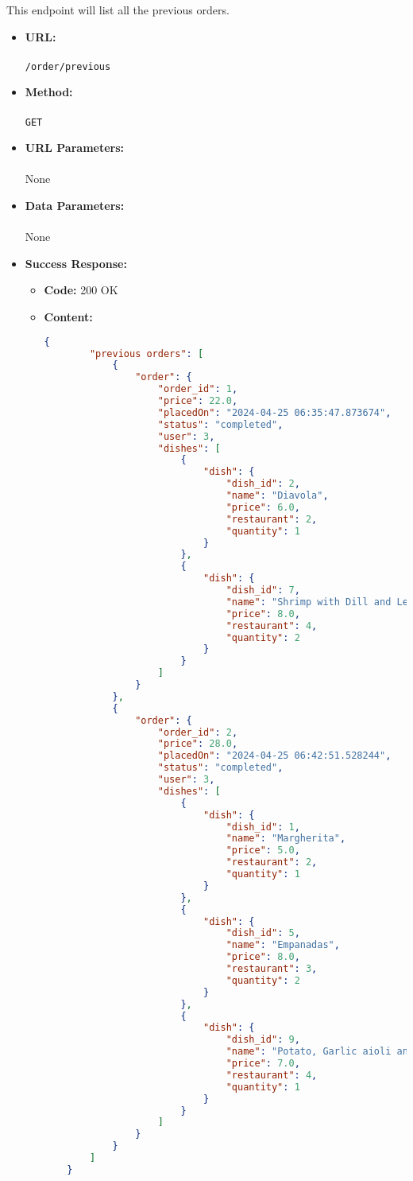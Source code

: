 

This endpoint will list all the previous orders.

\begin{itemize}
    \item \textbf{URL:} \\\\\texttt{/order/previous}
    \item \textbf{Method:} \\\\\texttt{GET}
    \item \textbf{URL Parameters:} \\\\None
    \item \textbf{Data Parameters:}\\\\None
    \item \textbf{Success Response:}
		\begin{itemize}
			\item[$\circ$] \textbf{Code:} 200 OK
			\item[] \textbf{Content:}
			\medskip
			\begin{lstlisting}[language=json]
	{
		"previous orders": [
			{
				"order": {
					"order_id": 1,
					"price": 22.0,
					"placedOn": "2024-04-25 06:35:47.873674",
					"status": "completed",
					"user": 3,
					"dishes": [
						{
							"dish": {
								"dish_id": 2,
								"name": "Diavola",
								"price": 6.0,
								"restaurant": 2,
								"quantity": 1
							}
						},
						{
							"dish": {
								"dish_id": 7,
								"name": "Shrimp with Dill and Lemon",
								"price": 8.0,
								"restaurant": 4,
								"quantity": 2
							}
						}
					]
				}
			},
			{
				"order": {
					"order_id": 2,
					"price": 28.0,
					"placedOn": "2024-04-25 06:42:51.528244",
					"status": "completed",
					"user": 3,
					"dishes": [
						{
							"dish": {
								"dish_id": 1,
								"name": "Margherita",
								"price": 5.0,
								"restaurant": 2,
								"quantity": 1
							}
						},
						{
							"dish": {
								"dish_id": 5,
								"name": "Empanadas",
								"price": 8.0,
								"restaurant": 3,
								"quantity": 2
							}
						},
						{
							"dish": {
								"dish_id": 9,
								"name": "Potato, Garlic aioli and Crispy Shallots",
								"price": 7.0,
								"restaurant": 4,
								"quantity": 1
							}
						}
					]
				}
			}
		]
	}

\end{lstlisting}
\end{itemize}
\end{itemize}
